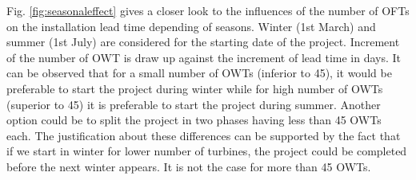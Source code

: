 Fig. \ref{fig:seasonaleffect} gives a closer look to the influences of the number of OFTs on the installation lead time depending of seasons. Winter (1st March) and summer (1st July) are considered for the starting date of the project. Increment of the number of OWT is draw up against the increment of lead time in days. It can be observed that for a small number of OWTs (inferior to 45), it would be preferable to start the project during winter while for high number of OWTs (superior to 45) it is preferable to start the project during summer. Another option could be to split the project in two phases having less than 45 OWTs each. The justification about these differences can be supported by the fact that if we start in winter for lower number of turbines, the project could be completed before the next winter appears. It is not the case for more than 45 OWTs.